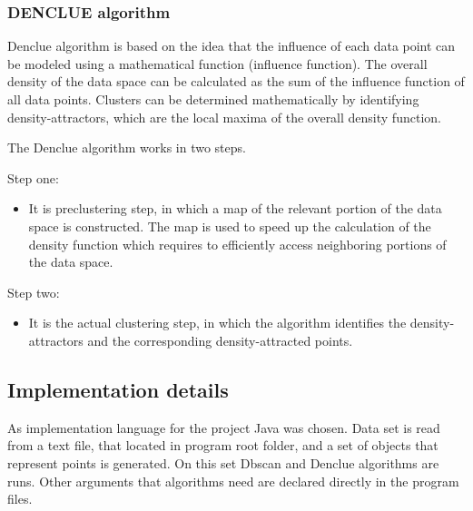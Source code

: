 \documentclass[12pt, a4paper, notitlepage, oneside]{article}
\begin{document}
\subsubsection*{DENCLUE algorithm}

Denclue algorithm is based on the idea that the influence of each data point can be modeled using a mathematical function (influence function). The overall density of the data space can be calculated as the sum of the influence function of all data points. Clusters can be determined mathematically by identifying density-attractors, which are the local maxima of the overall density function.

The Denclue algorithm works in two steps. 

Step one: 

\begin{itemize}
	\item It is preclustering step, in which a map of the relevant portion of the data space is constructed. The map is used to speed up the calculation of the density function which requires to efficiently access neighboring portions of the data space. 
\end{itemize}


Step two:

\begin{itemize}
	\item It is the actual clustering step, in which the algorithm identifies the density-attractors and the corresponding density-attracted points.
\end{itemize}

\subsection*{Implementation details}

As implementation language for the project Java was chosen. Data set is read from a text file, that located in program root folder, and a set of objects that represent points is generated. On this set Dbscan and Denclue algorithms are runs. Other arguments that algorithms need are declared directly in the program files.
\end{document}

